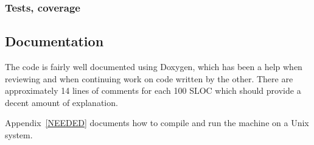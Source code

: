 \subsubsection{Tests, coverage}



\subsection{Documentation}

The code is fairly well documented using Doxygen, which has been a help when
reviewing and when continuing work on code written by the other. There are
approximately 14 lines of comments for each 100 SLOC which should provide a
decent amount of explanation.

Appendix~\ref{NEEDED} documents how to compile and run the machine on a Unix
system.


